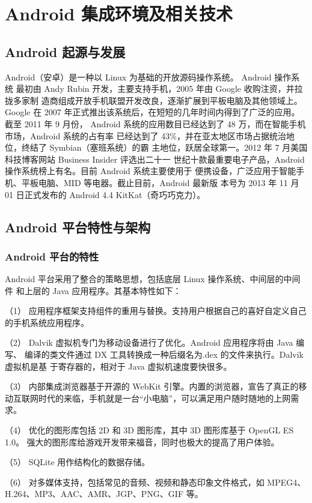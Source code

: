 \chapter{Android 集成环境及相关技术}
\section{Android 起源与发展}
Android（安卓）是一种以 Linux 为基础的开放源码操作系统。 Android 操作系统
最初由 Andy Rubin 开发，主要支持手机，2005 年由 Google 收购注资，并拉拢多家制
造商组成开放手机联盟开发改良，逐渐扩展到平板电脑及其他领域上。Google 在 2007
年正式推出该系统后，在短短的几年时间内得到了广泛的应用。截至 2011 年 9 月份，
Android 系统的应用数目已经达到了 48 万，而在智能手机市场，Android 系统的占有率
已经达到了 43\%，并在亚太地区市场占据统治地位，终结了 Symbian（塞班系统）的霸
主地位，跃居全球第一。2012 年 7 月美国科技博客网站 Business Insider 评选出二十一
世纪十款最重要电子产品，Android 操作系统榜上有名。目前 Android 系统主要使用于
便携设备，广泛应用于智能手机、平板电脑、MID 等电器。截止目前，Android 最新版
本号为 2013 年 11 月 01 日正式发布的 Android 4.4 KitKat（奇巧巧克力）。

\section{Android 平台特性与架构}
\subsection{Android 平台的特性}
Android 平台采用了整合的策略思想，包括底层 Linux 操作系统、中间层的中间件
和上层的 Java 应用程序。其基本特性如下\cite{4}：

（1） 应用程序框架支持组件的重用与替换。支持用户根据自己的喜好自定义自己
的手机系统应用程序。

（2） Dalvik 虚拟机专门为移动设备进行了优化。Android 应用程序将由 Java 编写、
编译的类文件通过 DX 工具转换成一种后缀名为.dex 的文件来执行。Dalvik 虚拟机是基
于寄存器的，相对于 Java 虚拟机速度要快很多。

（3） 内部集成浏览器基于开源的 WebKit 引擎。内置的浏览器，宣告了真正的移
动互联网时代的来临，手机就是一台“小电脑”，可以满足用户随时随地的上网需求。

（4） 优化的图形库包括 2D 和 3D 图形库，其中 3D 图形库基于 OpenGL ES 1.0。
强大的图形库给游戏开发带来福音，同时也极大的提高了用户体验。

（5） SQLite 用作结构化的数据存储。

（6） 对多媒体支持，包括常见的音频、视频和静态印象文件格式，如 MPEG4、
H.264、MP3、AAC、AMR、JGP、PNG、GIF 等。

